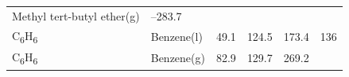 \documentclass[
  9pt,
]{extbook}
\theoremstyle{definition}
\theoremstyle{definition}
\theoremstyle{definition}
\theoremstyle{remark}
\begin{document}
\begin{longtable}[]{@{}llllll@{}}
\begin{minipage}[t]{0.17\columnwidth}
Methyl tert-butyl
ether(g)\strut
\end{minipage} & \begin{minipage}[t]{0.15\columnwidth}\raggedright
--283.7\strut
\end{minipage} & \begin{minipage}[t]{0.15\columnwidth}\raggedright
\strut
\end{minipage} & \begin{minipage}[t]{0.14\columnwidth}\raggedright
\strut
\end{minipage} & \begin{minipage}[t]{0.14\columnwidth}\raggedright
\strut
\end{minipage}\tabularnewline
\begin{minipage}[t]{0.07\columnwidth}\raggedright
C\textsubscript{6}H\textsubscript{6}\strut
\end{minipage} & \begin{minipage}[t]{0.17\columnwidth}\raggedright
Benzene(l)\strut
\end{minipage} & \begin{minipage}[t]{0.15\columnwidth}\raggedright
49.1\strut
\end{minipage} & \begin{minipage}[t]{0.15\columnwidth}\raggedright
124.5\strut
\end{minipage} & \begin{minipage}[t]{0.14\columnwidth}\raggedright
173.4\strut
\end{minipage} & \begin{minipage}[t]{0.14\columnwidth}\raggedright
136\strut
\end{minipage}\tabularnewline
\begin{minipage}[t]{0.07\columnwidth}\raggedright
C\textsubscript{6}H\textsubscript{6}\strut
\end{minipage} & \begin{minipage}[t]{0.17\columnwidth}\raggedright
Benzene(g)\strut
\end{minipage} & \begin{minipage}[t]{0.15\columnwidth}\raggedright
82.9\strut
\end{minipage} & \begin{minipage}[t]{0.15\columnwidth}\raggedright
129.7\strut
\end{minipage} & \begin{minipage}[t]{0.14\columnwidth}\raggedright
269.2\strut
\end{minipage} & \begin{minipage}[t]{0.14\columnwidth}\raggedright

\end{minipage}
\end{longtable}
\end{document}
